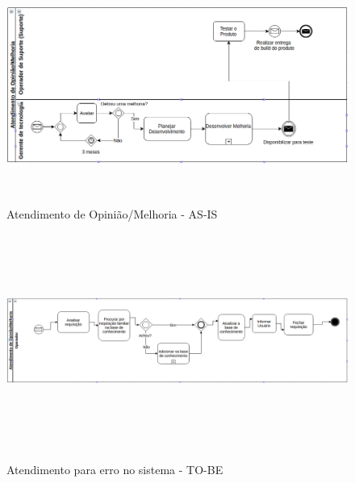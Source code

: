 \begin{figure}[!h]
\caption{Atendimento de Opinião/Melhoria - AS-IS}
\centering %
\includegraphics[width=15cm,height=7cm]{as-is/04_atendimento_de_melhoria.png}
\label{figura:atendimento_de_melhoria_as_is}
\end{figure}

\begin{figure}[!h]
\caption{Atendimento para erro no sistema -  TO-BE}
\centering %
\includegraphics[width=15cm,height=7cm]{to_be/04_atendimento_de_melhoria.png}
\label{figura:atendimento_de_erro_to_be}
\end{figure}
